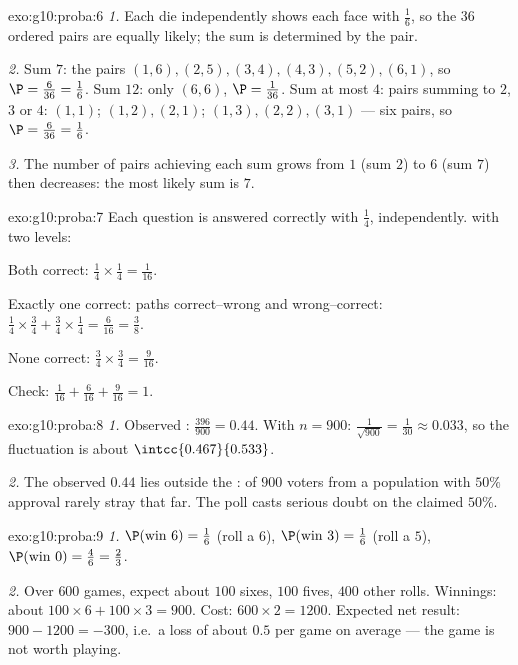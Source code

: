 \begin{solution}{exo:g10:proba:6}
\emph{1.} Each die independently shows each face with 
$\frac16$, so the $36$ ordered pairs are equally likely; the sum is
determined by the pair.

\emph{2.} Sum $7$: the pairs $(1,6), (2,5), (3,4), (4,3), (5,2), (6,1)$,
so $\P = \frac{6}{36} = \frac16$. Sum $12$: only $(6,6)$,
$\P = \frac{1}{36}$. Sum at most $4$: pairs summing to $2$, $3$ or $4$:
$(1,1)$; $(1,2), (2,1)$; $(1,3), (2,2), (3,1)$ --- six pairs, so
$\P = \frac{6}{36} = \frac16$.

\emph{3.} The number of pairs achieving each sum grows from $1$ (sum $2$)
to $6$ (sum $7$) then decreases: the most likely sum is $7$.
\end{solution}

\begin{solution}{exo:g10:proba:7}
Each question is answered correctly with  $\frac14$,
independently.  with two levels:

Both correct: $\frac14 \times \frac14 = \frac{1}{16}$.

Exactly one correct: paths correct--wrong and wrong--correct:
$\frac14 \times \frac34 + \frac34 \times \frac14 = \frac{6}{16}
= \frac38$.

None correct: $\frac34 \times \frac34 = \frac{9}{16}$.

Check: $\frac{1}{16} + \frac{6}{16} + \frac{9}{16} = 1$.
\end{solution}

\begin{solution}{exo:g10:proba:8}
\emph{1.} Observed : $\frac{396}{900} = 0.44$. With $n = 900$:
$\frac{1}{\sqrt{900}} = \frac{1}{30} \approx 0.033$, so the fluctuation
 is about $\intcc{0.467}{0.533}$.

\emph{2.} The observed $0.44$ lies outside the :  of $900$
voters from a population with $50\%$ approval rarely stray that far. The
poll casts serious doubt on the claimed $50\%$.
\end{solution}

\begin{solution}{exo:g10:proba:9}
\emph{1.} $\P(\text{win } 6) = \frac16$ (roll a $6$),
$\P(\text{win } 3) = \frac16$ (roll a $5$),
$\P(\text{win } 0) = \frac46 = \frac23$.

\emph{2.} Over $600$ games, expect about $100$ sixes, $100$ fives, $400$
other rolls. Winnings: about $100 \times 6 + 100 \times 3 = 900$. Cost:
$600 \times 2 = 1200$. Expected net result: $900 - 1200 = -300$, i.e.\ a
loss of about $0.5$ per game on average --- the game is not worth
playing.
\end{solution}

